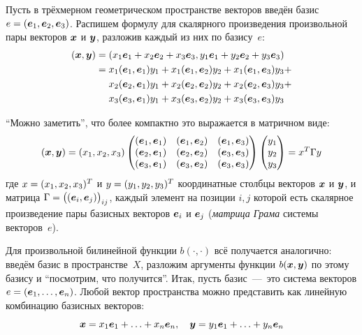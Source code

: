 \documentclass[a4paper,12pt]{article}
\begin{document}
  \begin{example}
    Пусть в трёхмерном геометрическом пространстве векторов введён базис $e \hm= (\bds e_1, \bds e_2, \bds e_3)$.
    Распишем формулу для скалярного произведения произвольной пары векторов $\boldsymbol x$ и $\boldsymbol y$, разложив каждый из них по базису~$e$:
    \begin{equation*}
    \begin{split}
      (\bds x, \bds y)
      &= (x_1 \bds e_1 + x_2 \bds e_2 + x_3 \bds e_3, y_1 \bds e_1 + y_2 \bds e_2 + y_3 \bds e_3)\\
      &= x_1 (\bds e_1, \bds e_1) y_1 + x_1 (\bds e_1, \bds e_2) y_2 + x_1 (\bds e_1, \bds e_3) y_3 +\\
      &\hphantom{= {}}\; x_2 (\bds e_2, \bds e_1) y_1 + x_2 (\bds e_2, \bds e_2) y_2 + x_2 (\bds e_2, \bds e_3) y_3 +\\  %
      &\hphantom{= {}}\; x_3 (\bds e_3, \bds e_1) y_1 + x_3 (\bds e_3, \bds e_2) y_2 + x_3 (\bds e_3, \bds e_3) y_3
    \end{split}
    \end{equation*}
    
    ``Можно заметить'', что более компактно это выражается в матричном виде:
    \[
      (\boldsymbol x, \boldsymbol y) = (x_1, x_2, x_3) \begin{pmatrix}
        (\boldsymbol e_1, \boldsymbol e_1) & (\boldsymbol e_1, \boldsymbol e_2) & (\boldsymbol e_1, \boldsymbol e_3)\\
        (\boldsymbol e_2, \boldsymbol e_1) & (\boldsymbol e_2, \boldsymbol e_2) & (\boldsymbol e_3, \boldsymbol e_3)\\
        (\boldsymbol e_3, \boldsymbol e_1) & (\boldsymbol e_3, \boldsymbol e_2) & (\boldsymbol e_3, \boldsymbol e_3)\\
      \end{pmatrix} \begin{pmatrix}
        y_1\\
        y_2\\
        y_3
      \end{pmatrix} = x^T \Gamma y
    \]
    где $x \hm= (x_1, x_2, x_3)^T$ и $y \hm= (y_1, y_2, y_3)^T$ координатные столбцы векторов $\boldsymbol x$ и $\boldsymbol y$, и матрица $\Gamma \hm= \bigl((\bds e_i, \bds e_j)\bigr)_{ij}$, каждый элемент на позиции $i, j$ которой есть скалярное произведение пары базисных векторов $\boldsymbol e_i$ и $\boldsymbol e_j$ (\emph{матрица Грама} системы векторов~$e$).
  \end{example}
  
  Для произвольной билинейной функции $b(\cdot, \cdot)$ всё получается аналогично:
  введём базис в пространстве~$X$, разложим аргументы функции $b(\boldsymbol x, \boldsymbol y)$ по этому базису и ``посмотрим, что получится''.
  Итак, пусть базис~---~это система векторов $e \hm= (\bds e_1, \ldots, \bds e_n)$.
  Любой вектор пространства можно представить как линейную комбинацию базисных векторов:
  \[
    \boldsymbol x = x_1 \boldsymbol e_1 + \ldots + x_n \boldsymbol e_n,
    \quad\boldsymbol y = y_1 \boldsymbol e_1 + \ldots + y_n \boldsymbol e_n
  \]
  
\end{document}
